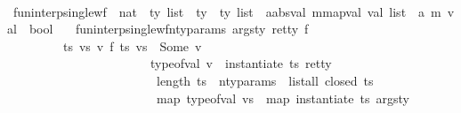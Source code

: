 \begin{isabellebody}
\ {\isachardoublequoteclose}\isanewline
\isanewline
\isanewline
{}\isamarkupfalse%
\ fun{\isacharunderscore}{\kern0pt}interp{\isacharunderscore}{\kern0pt}single{\isacharunderscore}{\kern0pt}wf{\isacharunderscore}{\kern0pt}{}\ {\isacharcolon}{\kern0pt}{\isacharcolon}{\kern0pt}\ {\isachardoublequoteopen}nat\ {\isasymtimes}\ ty\ list\ {\isasymtimes}\ ty\ {\isasymRightarrow}\ {\isacharparenleft}{\kern0pt}ty\ list\ {\isasymRightarrow}\ {\isacharparenleft}{\kern0pt}{\isacharprime}{\kern0pt}a{\isacharcolon}{\kern0pt}{\isacharcolon}{\kern0pt}absval{\isacharcomma}{\kern0pt}\ {\isacharprime}{\kern0pt}m{\isacharcolon}{\kern0pt}{\isacharcolon}{\kern0pt}mapval{\isacharparenright}{\kern0pt}\ val\ list\ {\isasymrightharpoonup}\ {\isacharparenleft}{\kern0pt}{\isacharprime}{\kern0pt}a{\isacharcomma}{\kern0pt}\ {\isacharprime}{\kern0pt}m{\isacharparenright}{\kern0pt}\ val{\isacharparenright}{\kern0pt}\ {\isasymRightarrow}\ bool{\isachardoublequoteclose}\isanewline
\ \ \ {\isachardoublequoteopen}fun{\isacharunderscore}{\kern0pt}interp{\isacharunderscore}{\kern0pt}single{\isacharunderscore}{\kern0pt}wf{\isacharunderscore}{\kern0pt}{}{\isacharparenleft}{\kern0pt}n{\isacharunderscore}{\kern0pt}ty{\isacharunderscore}{\kern0pt}params{\isacharcomma}{\kern0pt}\ args{\isacharunderscore}{\kern0pt}ty{\isacharcomma}{\kern0pt}\ ret{\isacharunderscore}{\kern0pt}ty{\isacharparenright}{\kern0pt}\ f\ {\isacharequal}{\kern0pt}\isanewline
\ \ \ \ \ \ \ \ \ {\isacharparenleft}{\kern0pt}{\isasymforall}ts\ vs\ v{\isachardot}{\kern0pt}\ {\isacharparenleft}{\kern0pt}f\ ts\ vs\ {\isacharequal}{\kern0pt}\ Some\ v\ {\isasymlongrightarrow}\ \isanewline
\ \ \ \ \ \ \ \ \ \ \ \ \ \ \ \ \ \ \ \ \ \ \ {\isacharparenleft}{\kern0pt}type{\isacharunderscore}{\kern0pt}of{\isacharunderscore}{\kern0pt}val\ v\ {\isacharequal}{\kern0pt}\ instantiate\ ts\ ret{\isacharunderscore}{\kern0pt}ty\ {\isasymand}\isanewline
\ \ \ \ \ \ \ \ \ \ \ \ \ \ \ \ \ \ \ \ \ \ \ \ length\ ts\ {\isacharequal}{\kern0pt}\ n{\isacharunderscore}{\kern0pt}ty{\isacharunderscore}{\kern0pt}params\ {\isasymand}\ list{\isacharunderscore}{\kern0pt}all\ closed\ ts\ {\isasymand}\ \isanewline
\ \ \ \ \ \ \ \ \ \ \ \ \ \ \ \ \ \ \ \ \ \ \ \ map\ type{\isacharunderscore}{\kern0pt}of{\isacharunderscore}{\kern0pt}val\ vs\ {\isacharequal}{\kern0pt}\ map\ {\isacharparenleft}{\kern0pt}instantiate\ ts{\isacharparenright}{\kern0pt}\ args{\isacharunderscore}{\kern0pt}ty{\isacharparenright}{\kern0pt}{\isacharparenright}{\kern0pt}\ \ {\isacharparenright}{\kern0pt}{\isachardoublequoteclose}\isanewline

\end{isabellebody}
